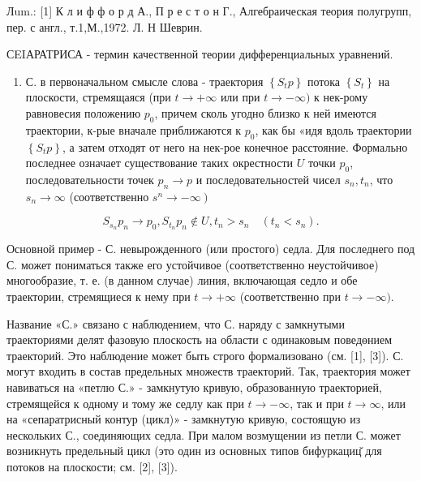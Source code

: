 \documentclass[10pt]{article}
\begin{document}
Лum.: [1] К л и ф ф о р д А., П р е с т о н Г., Алгебраическая теория полугрупп, пер. с англ., т.1,М.,1972. Л. Н Шеврин.



СEIАРАТРИСА - термин качественной теории дифференциальных уравнений.



\begin{enumerate}

  \item С. в первоначальном смысле слова - траектория $\left\{S_{t} p\right\}$ потока $\left\{S_{t}\right\}$ на плоскости, стремящаяся (при $t \rightarrow+\infty$ или при $t \rightarrow-\infty)$ к нек-рому равновесия положению $p_{0}$, причем сколь угодно близко к ней имеются траектории, к-рые вначале приближаются к $p_{0}$, как бы «идя вдоль траектории $\left\{S_{t} p\right\}$, а затем отходят от него на нек-рое конечное расстояние. Формально последнее означает существование таких окрестности $U$ точки $p_{0}$, последовательности точек $p_{n} \rightarrow p$ и последовательностей чисел $s_{n}, t_{n}$, что $s_{n} \rightarrow \infty$ (соответственно $\left.s^{n} \rightarrow-\infty\right)$

\end{enumerate}



\[

S_{s_{n}} p_{n} \rightarrow p_{0}, S_{t_{n}} p_{n} \notin U, t_{n}>s_{n} \quad\left(t_{n}<s_{n}\right) .

\]



Основной пример - С. невырожденного (или простого) седла. Для последнего под С. может пониматься также его устойчивое (соответственно неустойчивое) многообразие, т. е. (в данном случае) линия, включающая седло и обе траектории, стремящиеся к нему при $t \rightarrow+\infty$ (соответственно при $t \rightarrow-\infty)$.



Название «С.» связано с наблюдением, что С. наряду с замкнутыми траекториями делят фазовую плоскость на области с одинаковым поведөнием траекторий. Это наблюдение может быть строго формализовано (см. [1], [3]). С. могут входить в состав предельных множеств траекторий. Так, траектория может навиваться на «петлю С.» - замкнутую кривую, образованную траекторией, стремящейся к одному и тому же седлу как при $t \rightarrow-\infty$, так и при $t \rightarrow \infty$, или на «сепаратрисный контур (цикл)» - замкнутую кривую, состоящую из нескольких С., соединяющих седла. При малом возмущении из петли С. может возникнуть предельный цикл (это один из основных типов бифуркациц̆ для потоков на плоскости; см. [2], [3]).
\end{document}
